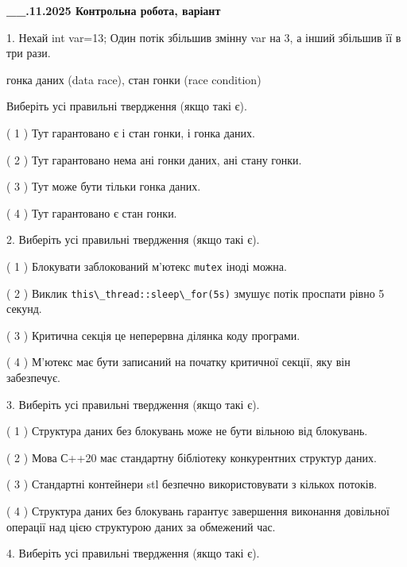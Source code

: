 \documentclass[12pt, ukrainian]{article}
\def\code#1{\Verb!#1!}
\begin{document}
\newpage
\begin {large}

\textbf{\_\_.11.2025 Контрольна робота, варіант  }\par


{
1. Нехай int var=13; Один потік збільшив змінну var на 3, а інший збільшив її в три рази.

гонка даних (data race), стан гонки (race condition)

Виберіть усі правильні твердження (якщо такі є).\par
\vspace{2mm}
( 1 ) Тут гарантовано є і стан гонки, і гонка даних.%

( 2 ) Тут гарантовано нема ані гонки даних, ані стану гонки.%

( 3 ) Тут може бути тільки гонка даних.%

( 4 ) Тут гарантовано є стан гонки.%


2. Виберіть усі правильні твердження (якщо такі є).\par
\vspace{2mm}

( 1 ) Блокувати заблокований м’ютекс  \code{mutex} іноді можна.%

( 2 ) Виклик \code{this\_thread::sleep\_for(5s)} змушує потік проспати рівно 5 секунд.%

( 3 ) Критична секція це неперервна ділянка коду програми.%

( 4 ) М’ютекс має бути записаний на початку критичної секції, яку він забезпечує.%


3. Виберіть усі правильні твердження (якщо такі є).\par
\vspace{2mm}

( 1 ) Структура даних без блокувань може не бути вільною від блокувань.%

( 2 ) Мова С++20 має стандартну бібліотеку конкурентних структур даних.%

( 3 ) Стандартні контейнери stl безпечно використовувати з кількох потоків.%

( 4 ) Структура даних без блокувань гарантує завершення виконання довільної операції над цією структурою даних за обмежений час.%


4. Виберіть усі правильні твердження (якщо такі є).\par
\vspace{2mm}

}
\end{large}
\end{document}
